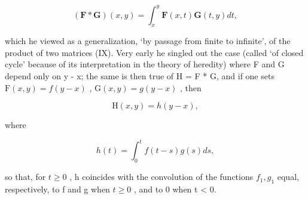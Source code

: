 \[
(\mathbf {F} * \mathbf {G}) (x, y) = \int_ {x} ^ {y} \mathbf {F} (x, t) \mathbf {G} (t, y) d t,
\]

which he viewed as a generalization, `by passage from finite to infinite', of the product of two matrices (IX). Very early he singled out the case (called `of closed cycle' because of its interpretation in the theory of heredity) where F and G depend only on y - x; the same is then true of H = F * G, and if one sets \(\mathrm{F}(x,y)=f(y-x)\) , \(\mathrm{G}(x,y)=g(y-x)\) , then

\[
\mathrm{H} (x, y) = h (y - x),
\]

where

\[
h (t) = \int_ {0} ^ {t} f (t - s) g (s) d s,
\]

so that, for \(t \geqslant 0\) , h coincides with the convolution of the functions \(f_{1}, g_{1}\) equal, respectively, to f and g when \(t \geqslant 0\) , and to 0 when t \textless{} 0.

